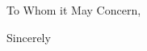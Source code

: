 \documentclass[10pt]{brownletter}
\begin{document}
\begin{letter}{}

\opening{To Whom it May Concern,}


\closing{Sincerely}




\end{letter}
\end{document}
